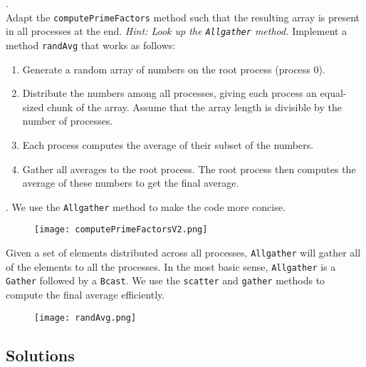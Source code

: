\documentclass[main]{subfiles}
\begin{document}
\begin{ExerciseList}
    
    \Exercise[title={Message Passing},label=MPI]. \quad \\
        \Question Adapt the \texttt{computePrimeFactors} method such that the resulting array is present in all processes at the end. \textit{Hint: Look up the \texttt{Allgather} method.}
        \Question Implement a method \texttt{randAvg} that works as follows:
            \begin{enumerate}
                \item Generate a random array of numbers on the root process (process 0).
                \item Distribute the numbers among all processes, giving each process an equal-sized chunk of the array. Assume that the array length is divisible by the number of processes.
                \item Each process computes the average of their subset of the numbers.
                \item Gather all averages to the root process. The root process then computes the average of these numbers to get the final average.
            \end{enumerate}
    
    \Answer[ref={MPI}]. \quad
        \Question We use the \texttt{Allgather} method to make the code more concise.
            \begin{figure}[H]
                \centering
                \texttt{[image: computePrimeFactorsV2.png]}
            \end{figure}
            Given a set of elements distributed across all processes, \texttt{Allgather} will gather all of the elements to all the processes. In the most basic sense, \texttt{Allgather} is a \texttt{Gather} followed by a \texttt{Bcast}.
        \pagebreak
        \Question We use the \texttt{scatter} and \texttt{gather} methods to compute the final average efficiently.
        \begin{figure}[H]
            \centering
            \texttt{[image: randAvg.png]}
        \end{figure}
\end{ExerciseList}
\newpage
\subsection{Solutions}
\shipoutAnswer
\end{document}
